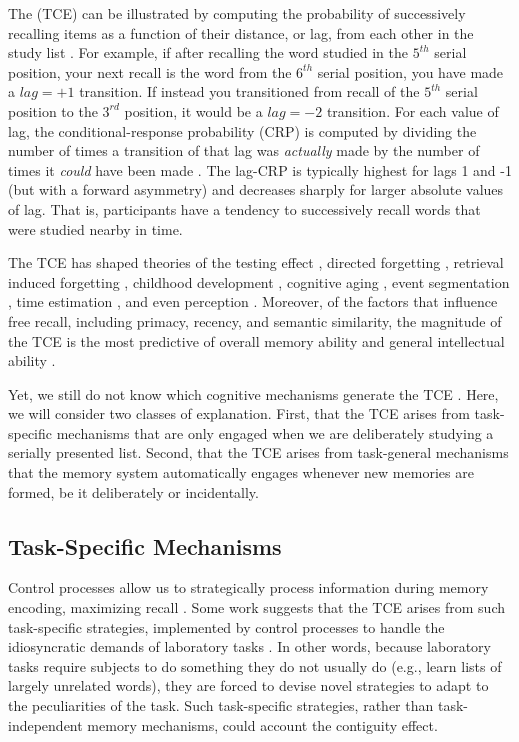 \documentclass[man,natbib,floatsintext]{apa6} %
\begin{document}
The (TCE) can be illustrated by computing the probability of successively recalling items as a function of their distance, or lag, from each other in the study list \citep{Kaha96}. For example, if after recalling the word studied in the $5^{th}$ serial position, your next recall is the word from the $6^{th}$ serial position, you have made a $lag=+1$ transition. If instead you transitioned from recall of the $5^{th}$ serial position to the $3^{rd}$ position, it would be a $lag=-2$ transition. For each value of lag, the conditional-response probability (CRP) is computed by dividing the number of times a transition of that lag was \emph{actually} made by the number of times it \emph{could} have been made \citep[e.g., if you have just recalled the last item in the list, it is not possible to a $lag=+1$ transition. Transitions to already recalled items are also excluded from the counts as subjects rarely repeat items;][]{Kaha96}. The lag-CRP is typically highest for lags 1 and -1 (but with a forward asymmetry) and decreases sharply for larger absolute values of lag. That is, participants have a tendency to successively recall words that were studied nearby in time.

The TCE has shaped theories of the testing effect \citep{KarpEtal14}, directed forgetting \citep{SahaEtal13}, retrieval induced forgetting \citep{KlieBaum16}, childhood development \citep{JarroEtal15}, cognitive aging \citep{WahlHuff15,HealKaha15}, event segmentation \citep{EzzyDava14}, time estimation \citep{SahaSmit13}, and even perception \citep{TurkEtal12}. Moreover, of the factors that influence free recall, including primacy, recency, and semantic similarity, the magnitude of the TCE is the most predictive of overall memory ability \citep{SedeEtal10,SpilUnsw11} and general intellectual ability \citep{HealEtal14}. 

Yet, we still do not know which cognitive mechanisms generate the TCE \citep{HealKaha17}. Here, we will consider two classes of explanation. First, that the TCE arises from task-specific mechanisms that are only engaged when we are deliberately studying a serially presented list. Second, that the TCE arises from task-general mechanisms that the memory system automatically engages whenever new memories are formed, be it deliberately or incidentally. 



\label{TODO-2}   
\subsection{Task-Specific Mechanisms}
Control processes \citep{LehmMalm13,AtkiShif68} allow us to strategically process information during memory encoding, maximizing recall \citep[e.g.,][]{Unsw16,DelaKnow05}. Some work suggests that the TCE arises from such task-specific strategies, implemented by control processes to handle the idiosyncratic demands of laboratory tasks \citep{Hint16}. In other words, because laboratory tasks require subjects to do something they do not usually do (e.g., learn lists of largely unrelated words), they are forced to devise novel strategies to adapt to the peculiarities of the task. Such task-specific strategies, rather than task-independent memory mechanisms, could account the contiguity effect.
\end{document}
